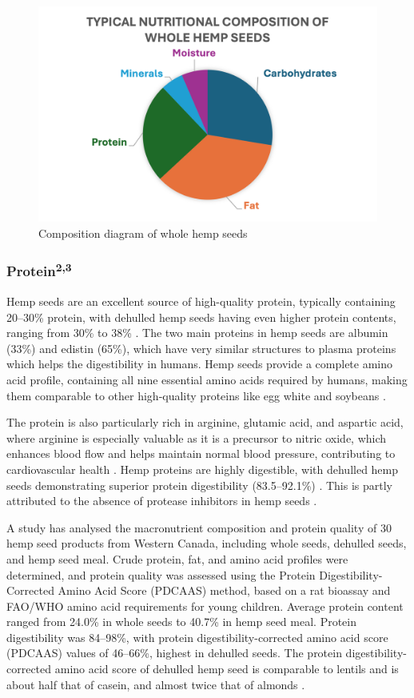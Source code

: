 \begin{figure}[H]
    \centering
    \includegraphics[width=0.73\linewidth]{Figures/fig_prod_concept_02.png}
    \caption{Composition diagram of whole hemp seeds}
    \label{fig:figure_05}
\end{figure}

\subsubsection{Protein\textsuperscript{2,3}}
Hemp seeds are an excellent source of high-quality protein, typically containing 20–30\% protein, with dehulled hemp seeds having even higher protein contents, ranging from 30\% to 38\% \cite*{HempBook}. The two main proteins in hemp seeds are albumin (33\%) and edistin (65\%), which have very similar structures to plasma proteins which helps the digestibility in humans. Hemp seeds provide a complete amino acid profile, containing all nine essential amino acids required by humans, making them comparable to other high-quality proteins like egg white and soybeans \cite*{HempBook}.

\vspace{1em}
The protein is also particularly rich in arginine, glutamic acid, and aspartic acid, where arginine is especially valuable as it is a precursor to nitric oxide, which enhances blood flow and helps maintain normal blood pressure, contributing to cardiovascular health \cite*{HempBook}.
Hemp proteins are highly digestible, with dehulled hemp seeds demonstrating superior protein digestibility (83.5–92.1\%) \cite*{montero2023hemp}. This is partly attributed to the absence of protease inhibitors in hemp seeds \cite*{aluko2017hemp}. 

\vspace{1em}
A study has analysed the macronutrient composition and protein quality of 30 hemp seed products from Western Canada, including whole seeds, dehulled seeds, and hemp seed meal. Crude protein, fat, and amino acid profiles were determined, and protein quality was assessed using the Protein Digestibility-Corrected Amino Acid Score (PDCAAS) method, based on a rat bioassay and FAO/WHO amino acid requirements for young children. Average protein content ranged from 24.0\% in whole seeds to 40.7\% in hemp seed meal. Protein digestibility was 84–98\%, with protein digestibility-corrected amino acid score (PDCAAS) values of 46–66\%, highest in dehulled seeds. The protein digestibility-corrected amino acid score of dehulled hemp seed is comparable to lentils and is about half that of casein, and almost twice that of almonds \cite*{HempBook}.

